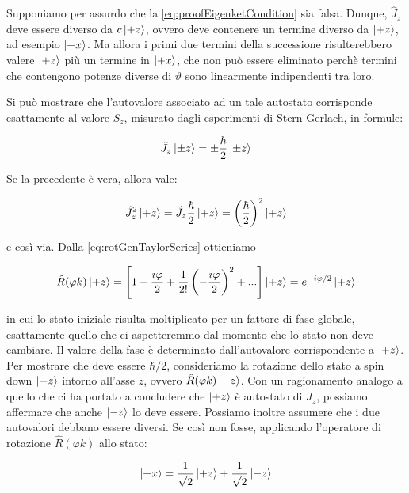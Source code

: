 Supponiamo per assurdo che la \eqref{eq:proofEigenketCondition} sia falsa. Dunque, $\hat{J}_z$ deve essere diverso da $c \ket{+z}$, ovvero deve contenere un termine diverso da $\ket{+z}$, ad esempio $\ket{+x}$. Ma allora i primi  due termini della successione risulterebbero valere $\ket{+z}$ pi\`u un termine in $\ket{+x}$, che non pu\`o essere eliminato perch\`e termini che contengono potenze diverse di $\vartheta$ sono linearmente indipendenti tra loro.

Si pu\`o mostrare che l'autovalore associato ad un tale autostato corrisponde esattamente al valore $S_z$, misurato dagli esperimenti di Stern-Gerlach, in formule:
 
 	\begin{equation}
 		\hat{J}_z \ket{\pm z} = \pm \frac{\hbar}{2} \ket{\pm z}
 	\end{equation}
 
Se la precedente \`e vera, allora vale:
 
 	\begin{equation}
 		\hat{J}_z^2 \ket{+z} = \hat{J}_z \frac{\hbar}{2} \ket{+z} = \left ( \frac{\hbar}{2} \right ) ^ 2 \ket{+z}
 	\end{equation}
 
e cos\`i via. Dalla \eqref{eq:rotGenTaylorSeries} ottieniamo
 
 	\begin{equation} \label{eq:rotateSpinUp}
 		\hat{R}( \varphi k) \ket{+z} = \left [ 1 - \frac{i \varphi}{2} + \frac{1}{2!} \left ( - \frac{i \varphi}{2} \right )^2 + ... \right ] \ket{+z} = e^{-i \varphi / 2} \ket{+z}
 	\end{equation}
 
in cui lo stato iniziale risulta moltiplicato per un fattore di fase globale, esattamente quello che ci aspetteremmo dal momento che lo stato non deve cambiare. Il valore della fase \`e determinato dall'autovalore corrispondente a $\ket{+z}$. Per mostrare che deve essere $\hbar / 2$, consideriamo la rotazione dello stato a spin down $\ket{-z}$ intorno all'asse $z$, ovvero $\hat{R}(\varphi k) \ket{-z}$. Con un ragionamento analogo a quello che ci ha portato a concludere che $\ket{+z}$ \`e autostato di $\hat{J}_z$, possiamo affermare che anche $\ket{-z}$ lo deve essere. Possiamo inoltre assumere che i due autovalori debbano essere diversi. Se cos\`i non fosse, applicando l'operatore di rotazione $\hat{R} (\varphi k )$ allo stato:

	\begin{equation}
		\ket{+x} = \frac{1}{\sqrt{2}} \ket{+z} + \frac{1}{\sqrt{2}} \ket{-z}
	\end{equation}

